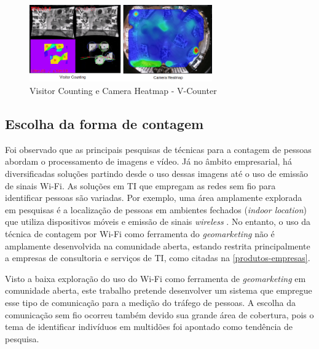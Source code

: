 \begin{figure}[htb]
  \caption{\label{v-count2}Visitor Counting e Camera Heatmap - V-Counter}
  \begin{center}
    \includegraphics[width=0.70\textwidth]{img/termal-vcount.png}
  \end{center}
\end{figure}

\subsection{Escolha da forma de contagem}
Foi observado que as principais pesquisas de técnicas para a contagem de pessoas abordam o processamento de imagens e vídeo. Já no âmbito empresarial,
há diversificadas soluções partindo desde o uso dessas imagens até o uso de emissão de sinais Wi-Fi.
As soluções em TI que empregam as redes sem fio para identificar pessoas são variadas. Por exemplo,
uma área amplamente explorada em pesquisas é a localização de pessoas em
ambientes fechados (\emph{indoor location}) que utiliza dispositivos móveis e emissão de sinais \emph{wireless} \cite{Ferreira2016}
\cite{Puhl2016} \cite{Figuera2011}. No entanto, o uso da técnica de contagem por Wi-Fi como ferramenta do \emph{geomarketing} não
é amplamente desenvolvida na comunidade aberta, estando restrita principalmente a empresas de consultoria e serviços de TI, como citadas
na \autoref{produtos-empresas}.

Visto a baixa exploração do uso do Wi-Fi como ferramenta de \emph{geomarketing} em comunidade aberta, este trabalho pretende
desenvolver um sistema que empregue esse tipo de comunicação para a medição do tráfego de pessoas. A escolha da comunicação
sem fio ocorreu também devido sua grande área de cobertura, pois o tema de identificar indivíduos
em multidões foi apontado como tendência de pesquisa.


